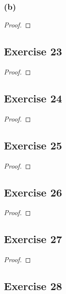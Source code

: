 \documentclass[14pt]{extarticle}
\begin{document}
\subsubsection{(b)}

\begin{proof}

\end{proof}

\subsection{Exercise 23}

\begin{proof}

\end{proof}

\subsection{Exercise 24}

\begin{proof}

\end{proof}

\subsection{Exercise 25}

\begin{proof}

\end{proof}

\subsection{Exercise 26}

\begin{proof}

\end{proof}

\subsection{Exercise 27}

\begin{proof}

\end{proof}

\subsection{Exercise 28}
\end{document}
